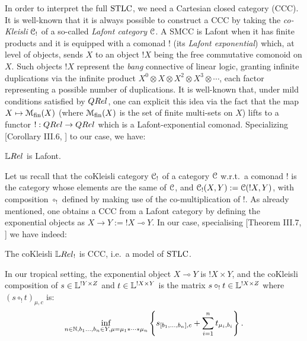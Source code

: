 
In order to interpret the full $\mathrm{STLC}$, we need a Cartesian closed category (CCC).
It is well-known \cite{Mellies2009} that it is always possible to construct a CCC by taking the \emph{co-Kleisli} $\mathcal{C}_!$ of a so-called \emph{Lafont category} $\mathcal{C}$.
A SMCC is Lafont when it has finite products and it is equipped with a comonad $!$ (its \emph{Lafont exponential}) which, at level of objects, sends $X$ to an object $!X$ being the free commutative comonoid on $X$.
Such objects $!X$ represent the \emph{bang} connective of linear logic, granting infinite duplications via the infinite product $X^0\otimes X\otimes X^2\otimes X^3\otimes\cdots$, each factor representing a possible number of duplications.
It is well-known that, under mild conditions satisfied by $\QREL$, one can explicit this idea via the fact that the map $X\mapsto \mathcal{M}_{\mathrm{fin}}(X)$ (where $\mathcal{M}_{\mathrm{fin}}(X)$ is the set of finite multi-sets on $X$) lifts to a functor $!:\QREL\to\QREL$ which is a Lafont-exponential comonad.
Specializing [Corollary III.6, \cite{Manzo2013}] to our case, we have:

\begin{fact}
 $\LREL$ is Lafont.
\end{fact}

Let us recall that the coKleisli category $\mathcal{C}_!$ of a category $\mathcal{C}$ w.r.t.\ a comonad $!$ is the category whose elements are the same of $\mathcal{C}$, and ${\mathcal{C}_!}(X,Y):={\mathcal{C}}(!X,Y)$, with composition $\circ_!$ defined by making use of the co-multiplication of $!$.
As already mentioned, one obtains a CCC from a Lafont category by defining the exponential objects as $X\to Y:=!X \multimap Y$.
In our case, specialising [Theorem III.7, \cite{Manzo2013}] we have indeed:
\begin{fact}
 The coKleisli $\LREL_!$ is CCC, i.e.\ a model of $\mathrm{STLC}$.
\end{fact}

In our tropical setting, 
the exponential object $X\multimap Y$ is $!X\times Y$, and 
the coKleisli composition of $s\in\mathbb{L}^{!Y\times Z}$ and $t\in\mathbb{L}^{!X\times Y}$ is the matrix $s\circ_! t\in\mathbb{L}^{!X\times Z}$ where $(s\circ_! t)_{\mu,c}$ is:
\begin{align}
 \inf\limits_{n\in\mathbb{N}, b_1\dots,b_n\in Y, \mu = \mu_1*\cdots *\mu_n}
 \left\{s_{[b_1,\dots,b_n],c} + \sum\limits_{i=1}^n t_{\mu_i,b_i}\right\}.
\end{align}

